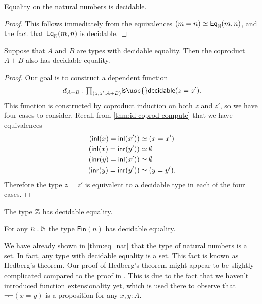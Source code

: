 \begin{cor}
  Equality on the natural numbers is decidable.
\end{cor}

\begin{proof}
  This follows immediately from the equivalences $(m=n)\simeq \mathsf{Eq}_{{\mathbb{N}}}(m,n)$, and the fact that $\mathsf{Eq}_{{\mathbb{N}}}(m,n)$ is decidable.
\end{proof}

\begin{lem}
  Suppose that $A$ and $B$ are types with decidable equality. Then the coproduct $A+B$ also has decidable equality.
\end{lem}

\begin{proof}
  Our goal is to construct a dependent function
  \begin{equation*}
    d_{A+B} : \prd{z,z':A+B}\mathsf{is\usc{}decidable}(z=z').
  \end{equation*}
  This function is constructed by coproduct induction on both $z$ and $z'$, so we have four cases to consider. Recall from \cref{thm:id-coprod-compute} that we have equivalences
  \begin{align*}
    ({\mathsf{inl}}(x)={\mathsf{inl}}(x')) & \simeq (x=x') \\
    ({\mathsf{inl}}(x)={\mathsf{inr}}(y')) & \simeq \emptyset \\
    ({\mathsf{inr}}(y)={\mathsf{inl}}(x')) & \simeq \emptyset \\
    ({\mathsf{inr}}(y)={\mathsf{inr}}(y')) & \simeq (y=y').
  \end{align*}
  Therefore the type $z=z'$ is equivalent to a decidable type in each of the four cases.
\end{proof}

\begin{cor}
  The type ${\mathbb{Z}}$ has decidable equality.
\end{cor}

\begin{cor}
  For any $n:{\mathbb{N}}$ the type $\mathsf{Fin}(n)$ has decidable equality. 
\end{cor}

We have already shown in \cref{thm:eq_nat} that the type of natural numbers is a set. In fact, any type with decidable equality is a set. This fact is known as Hedberg's theorem. Our proof of Hedberg's theorem might appear to be slightly complicated compared to the proof in \cite{hottbook}. This is due to the fact that we haven't introduced function extensionality yet, which is used there to observe that $\neg\neg(x=y)$ is a proposition for any $x,y:A$.

